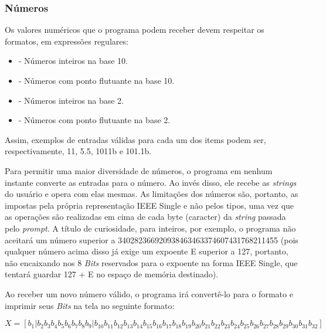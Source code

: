 \documentclass[11pt]{article}
\begin{document}
\subsubsection{Números}

\indent\indent Os valores numéricos que o programa podem receber devem respeitar os formatos, em expressões regulares:

\begin{itemize}
  \item {\ttfamily{[0-9]+}} - Números inteiros na base 10.
  \item {} - Números com ponto flutuante na base 10.
  \item {} - Números inteiros na base 2.
  \item {} - Números com ponto flutuante na base 2.
\end{itemize}

Assim, exemplos de entradas válidas para cada um dos items podem ser, respectivamente, 11, 5.5, 1011b e 101.1b.

Para permitir uma maior diversidade de números, o programa em nenhum instante converte as entradas para o número. Ao invés disso,
ele recebe as \textit{strings} do usuário e opera com elas mesmas. As limitações dos números são, portanto, as impostas pela própria representação
IEEE Single e não pelos tipos, uma vez que as operações são realizadas em cima de cada byte (caracter) da \textit{string} passada pelo \textit{prompt}.
A título de curiosidade, para inteiros, por exemplo, o programa não aceitará um número superior a 340282366920938463463374607431768211455 (pois qualquer número acima
disso já exige um expoente E superior a 127, portanto, não encaixando nos 8 \textit{Bits} reservados para o expoente na forma IEEE Single, que tentará guardar 127 + E no espaço
de memória destinado).

Ao receber um novo número válido, o programa irá convertê-lo para o formato e imprimir seus \textit{Bits} na tela no seguinte formato:
\begin{center}
  {\small$ X = [ b_1 | b_2 b_3 b_4 b_5 b_6 b_7 b_8 b_9 | b_{10} b_{11} b_{12} b_{13} b_{14} b_{15} b_{16} b_{17} b_{18} b_{19} b_{20} b_{21} b_{22} b_{23} b_{24} b_{25} b_{26} b_{27} b_{28} b_{29} b_{30} b_{31} b_{32}] $}
\end{center}
\end{document}
